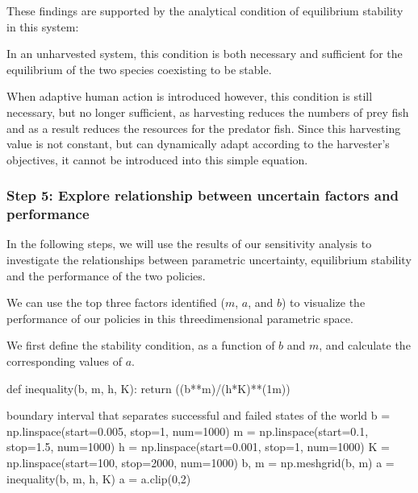 \documentclass[letterpaper,10pt,english]{book}
\let\sphinxpxdimen\pdfpxdimen\else\newdimen\sphinxpxdimen
\begin{document}
\sphinxAtStartPar
These findings are supported by the analytical condition of equilibrium
stability in this system:

\noindent\sphinxincludegraphics[width=406\sphinxpxdimen,height=96\sphinxpxdimen]{{eqn4}.png}

\sphinxAtStartPar
In an unharvested system, this condition is both necessary and
sufficient for the equilibrium of the two species coexisting to be
stable.

\sphinxAtStartPar
When adaptive human action is introduced however, this condition is
still necessary, but no longer sufficient, as harvesting reduces the
numbers of prey fish and as a result reduces the resources for the
predator fish. Since this harvesting value is not constant, but can
dynamically adapt according to the harvester’s objectives, it cannot be
introduced into this simple equation.


\subsubsection{Step 5: Explore relationship between uncertain factors and performance}
\label{\detokenize{A2_Jupyter_Notebooks:step-5-explore-relationship-between-uncertain-factors-and-performance}}
\sphinxAtStartPar
In the following steps, we will use the results of our sensitivity
analysis to investigate the relationships between parametric
uncertainty, equilibrium stability and the performance of the two
policies.

\sphinxAtStartPar
We can use the top three factors identified (\(m\), \(a\), and
\(b\)) to visualize the performance of our policies in this
three\sphinxhyphen{}dimensional parametric space.

\sphinxAtStartPar
We first define the stability condition, as a function of \(b\) and
\(m\), and calculate the corresponding values of \(a\).

\begin{sphinxVerbatim}[commandchars=\\\{\}]
def inequality(b, m, h, K):
    return ((b**m)/(h*K)**(1\PYGZhy{}m))

\PYGZsh{} boundary interval that separates successful and failed states of the world
b = np.linspace(start=0.005, stop=1, num=1000)
m = np.linspace(start=0.1, stop=1.5, num=1000)
h = np.linspace(start=0.001, stop=1, num=1000)
K = np.linspace(start=100, stop=2000, num=1000)
b, m = np.meshgrid(b, m)
a = inequality(b, m, h, K)
a = a.clip(0,2)
\end{sphinxVerbatim}
\end{document}
